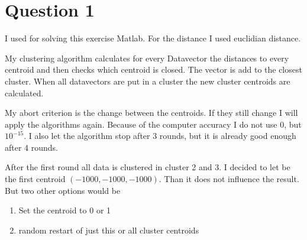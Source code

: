 \section*{Question 1}
I used for solving this exercise Matlab. For the distance I used euclidian
distance.

My clustering algorithm calculates for every Datavector the distances to
every centroid and then checks which centroid is closed. The vector is add to
the closest cluster. When all datavectors are put in a cluster the new cluster
centroids are calculated. 

My abort criterion is the change between the centroids. If they still change I
will apply the algorithms again. Because of the computer accuracy I do not use
0, but $10^{-15}$. I also let the algorithm stop after 3 rounds, but it is
already good enough after 4 rounds.

After the first round all data is clustered in cluster 2 and 3. I decided to let
be the first centroid $(-1000,-1000,-1000)$. Than it does not influence the
result. But two other options would be
\begin{enumerate}
  \item Set the centroid to 0 or 1 
  \item random restart of just this or all cluster centroids
\end{enumerate}

